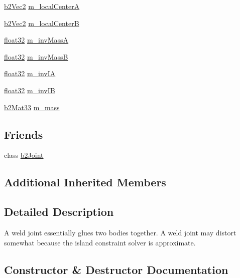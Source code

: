 \begin{DoxyCompactItemize}
\item 
\mbox{\hyperlink{structb2_vec2}{b2\+Vec2}} \mbox{\hyperlink{classb2_weld_joint_a18360f1e82a3a4e4fdfb3e6cba85160c}{m\+\_\+local\+CenterA}}
\item 
\mbox{\hyperlink{structb2_vec2}{b2\+Vec2}} \mbox{\hyperlink{classb2_weld_joint_a71281fbd18892e3f9653490bf85a844a}{m\+\_\+local\+CenterB}}
\item 
\mbox{\hyperlink{b2_settings_8h_aacdc525d6f7bddb3ae95d5c311bd06a1}{float32}} \mbox{\hyperlink{classb2_weld_joint_abb8cd34e03146dbae6af123ed75c2ee5}{m\+\_\+inv\+MassA}}
\item 
\mbox{\hyperlink{b2_settings_8h_aacdc525d6f7bddb3ae95d5c311bd06a1}{float32}} \mbox{\hyperlink{classb2_weld_joint_a071f8b347a1167adb144a575749b6fc5}{m\+\_\+inv\+MassB}}
\item 
\mbox{\hyperlink{b2_settings_8h_aacdc525d6f7bddb3ae95d5c311bd06a1}{float32}} \mbox{\hyperlink{classb2_weld_joint_af1420cccbd68021c24cc279bf55fabb9}{m\+\_\+inv\+IA}}
\item 
\mbox{\hyperlink{b2_settings_8h_aacdc525d6f7bddb3ae95d5c311bd06a1}{float32}} \mbox{\hyperlink{classb2_weld_joint_a25dc4f3e300ee00a29ca141ac6d894fa}{m\+\_\+inv\+IB}}
\item 
\mbox{\hyperlink{structb2_mat33}{b2\+Mat33}} \mbox{\hyperlink{classb2_weld_joint_ad07c6f68bd3ee2d62e4a8d656d526cf3}{m\+\_\+mass}}
\end{DoxyCompactItemize}
\subsection*{Friends}
\begin{DoxyCompactItemize}
\item 
class \mbox{\hyperlink{classb2_weld_joint_a54ade8ed3d794298108d7f4c4e4793fa}{b2\+Joint}}
\end{DoxyCompactItemize}
\subsection*{Additional Inherited Members}


\subsection{Detailed Description}
A weld joint essentially glues two bodies together. A weld joint may distort somewhat because the island constraint solver is approximate. 

\subsection{Constructor \& Destructor Documentation}
\mbox{\label{classb2_weld_joint_a84dbb52e983d9039eab6ad64ae62d8eb}} 
